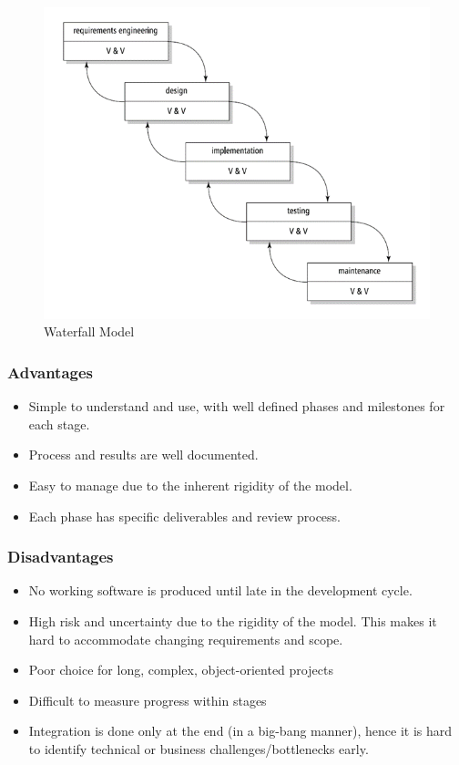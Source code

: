 \documentclass{article}
\begin{document}
\begin{figure}[!h]
    \centering
    \includegraphics[scale=0.5]{se1.png}
    \caption{Waterfall Model}
    \label{fig:my_label}
\end{figure}

\subsubsection{Advantages}
\begin{itemize}
    \item Simple to understand and use, with well defined phases and milestones for each stage.
    
    \item Process and results are well documented. 
    
    \item Easy to manage due to the inherent rigidity of the model.
    
    \item Each phase has specific deliverables and review process. 
\end{itemize}

\subsubsection{Disadvantages}
\begin{itemize}
    \item No working software is produced until late in the development cycle. 
    
    \item High risk and uncertainty due to the rigidity of the model. This makes it hard to accommodate changing requirements and scope. 
    
    \item Poor choice for long, complex, object-oriented projects 
    
    \item Difficult to measure progress within stages
    
    \item Integration is done only at the end (in a big-bang manner), hence it is hard to identify technical or business challenges/bottlenecks early. 
\end{itemize}
\end{document}
